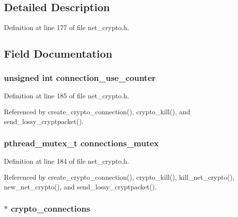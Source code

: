 \subsection{Detailed Description}


Definition at line 177 of file net\+\_\+crypto.\+h.



\subsection{Field Documentation}
\hypertarget{struct_net___crypto_ab5be057850e1cee67902276a69900326}{
\subsubsection[{connection\+\_\+use\+\_\+counter}]{\setlength{\rightskip}{0pt plus 5cm}unsigned int connection\+\_\+use\+\_\+counter}}\label{struct_net___crypto_ab5be057850e1cee67902276a69900326}


Definition at line 185 of file net\+\_\+crypto.\+h.



Referenced by create\+\_\+crypto\+\_\+connection(), crypto\+\_\+kill(), and send\+\_\+lossy\+\_\+cryptpacket().

\hypertarget{struct_net___crypto_a213135bf3b5b80b1cfe99b27dc42815e}{
\subsubsection[{connections\+\_\+mutex}]{\setlength{\rightskip}{0pt plus 5cm}pthread\+\_\+mutex\+\_\+t connections\+\_\+mutex}}\label{struct_net___crypto_a213135bf3b5b80b1cfe99b27dc42815e}


Definition at line 184 of file net\+\_\+crypto.\+h.



Referenced by create\+\_\+crypto\+\_\+connection(), crypto\+\_\+kill(), kill\+\_\+net\+\_\+crypto(), new\+\_\+net\+\_\+crypto(), and send\+\_\+lossy\+\_\+cryptpacket().

\hypertarget{struct_net___crypto_a13fdc865b8a114466ba136f5390ec1b2}{
\subsubsection[{crypto\+\_\+connections}]{$\ast$ crypto\+\_\+connections}}\label{struct_net___crypto_a13fdc865b8a114466ba136f5390ec1b2}


